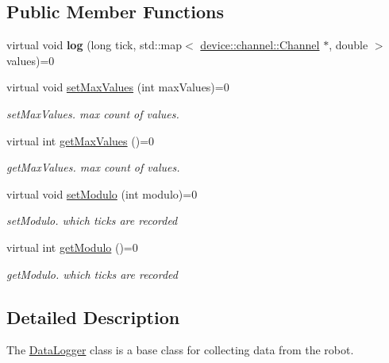 \subsection*{Public Member Functions}
\begin{DoxyCompactItemize}
\item 
\hypertarget{classdrobot_1_1datalogger_1_1DataLogger_ad59b8bf1de2dd432d5d53c35f5453bde}{virtual void {\bfseries log} (long tick, std\-::map$<$ \hyperlink{classdrobot_1_1device_1_1channel_1_1Channel}{device\-::channel\-::\-Channel} $\ast$, double $>$ values)=0}\label{classdrobot_1_1datalogger_1_1DataLogger_ad59b8bf1de2dd432d5d53c35f5453bde}

\item 
virtual void \hyperlink{classdrobot_1_1datalogger_1_1DataLogger_ae90262e477952f8e1c385b84e17d80c6}{set\-Max\-Values} (int max\-Values)=0
\begin{DoxyCompactList}\small\item\em set\-Max\-Values. max count of values. \end{DoxyCompactList}\item 
virtual int \hyperlink{classdrobot_1_1datalogger_1_1DataLogger_a8fe7bb2a626d9f9d5c69f9197490515b}{get\-Max\-Values} ()=0
\begin{DoxyCompactList}\small\item\em get\-Max\-Values. max count of values. \end{DoxyCompactList}\item 
virtual void \hyperlink{classdrobot_1_1datalogger_1_1DataLogger_ae463aebd8cb38c716bef83d5732042b1}{set\-Modulo} (int modulo)=0
\begin{DoxyCompactList}\small\item\em set\-Modulo. which ticks are recorded \end{DoxyCompactList}\item 
virtual int \hyperlink{classdrobot_1_1datalogger_1_1DataLogger_a4dd79d4060e4d4d77451a50777792c0a}{get\-Modulo} ()=0
\begin{DoxyCompactList}\small\item\em get\-Modulo. which ticks are recorded \end{DoxyCompactList}\end{DoxyCompactItemize}


\subsection{Detailed Description}
The \hyperlink{classdrobot_1_1datalogger_1_1DataLogger}{Data\-Logger} class is a base class for collecting data from the robot. 

